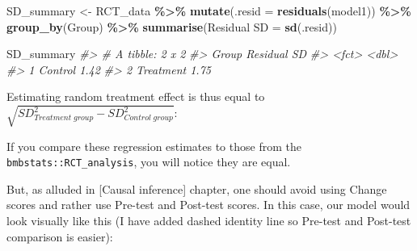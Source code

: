 \documentclass[
]{book}
\newenvironment{Shaded}{\begin{snugshade}}{\end{snugshade}}
\newcommand{\CommentTok}[1]{\textcolor[rgb]{0.56,0.35,0.01}{\textit{#1}}}
\newcommand{\DataTypeTok}[1]{\textcolor[rgb]{0.13,0.29,0.53}{#1}}
\newcommand{\DecValTok}[1]{\textcolor[rgb]{0.00,0.00,0.81}{#1}}
\newcommand{\KeywordTok}[1]{\textcolor[rgb]{0.13,0.29,0.53}{\textbf{#1}}}
\newcommand{\NormalTok}[1]{#1}
\newcommand{\OperatorTok}[1]{\textcolor[rgb]{0.81,0.36,0.00}{\textbf{#1}}}
\newcommand{\StringTok}[1]{\textcolor[rgb]{0.31,0.60,0.02}{#1}}
\begin{document}
\begin{Shaded}
\begin{Highlighting}[]
\NormalTok{SD\_summary <{-}}\StringTok{ }\NormalTok{RCT\_data }\OperatorTok{\%>\%}
\StringTok{  }\KeywordTok{mutate}\NormalTok{(}\DataTypeTok{.resid =} \KeywordTok{residuals}\NormalTok{(model1)) }\OperatorTok{\%>\%}
\StringTok{  }\KeywordTok{group\_by}\NormalTok{(Group) }\OperatorTok{\%>\%}
\StringTok{  }\KeywordTok{summarise}\NormalTok{(}\StringTok{\textasciigrave{}}\DataTypeTok{Residual SD}\StringTok{\textasciigrave{}}\NormalTok{ =}\StringTok{ }\KeywordTok{sd}\NormalTok{(.resid))}

\NormalTok{SD\_summary}
\CommentTok{\#> \# A tibble: 2 x 2}
\CommentTok{\#>   Group     \textasciigrave{}Residual SD\textasciigrave{}}
\CommentTok{\#>   <fct>             <dbl>}
\CommentTok{\#> 1 Control            1.42}
\CommentTok{\#> 2 Treatment          1.75}
\end{Highlighting}
\end{Shaded}

Estimating random treatment effect is thus equal to \(\sqrt{SD_{Treatment \;group}^2 - SD_{Control \; group}^2}\):

\begin{Shaded}
\end{Shaded}

If you compare these regression estimates to those from the \texttt{bmbstats::RCT\_analysis}, you will notice they are equal.

But, as alluded in {[}Causal inference{]} chapter, one should avoid using Change scores and rather use Pre-test and Post-test scores. In this case, our model would look visually like this (I have added dashed identity line so Pre-test and Post-test comparison is easier):
\end{document}

